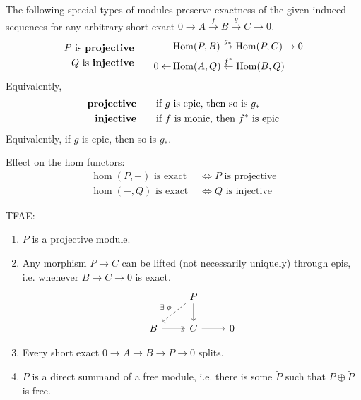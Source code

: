 \documentclass[twoside,10pt]{report}
\begin{document}
\begin{defn}[]
	The following special types of modules preserve exactness of the given induced sequences for any arbitrary short exact $0 \to A\stackrel{f}{\to } B\stackrel{g}{\to } C\to 0$.
	\begin{equation*}
		\begin{aligned}
			P \text{ is \textbf{projective}} \\
			Q \text{ is \textbf{injective}}
		\end{aligned}
		\qquad
		\begin{aligned}
			&\operatorname{Hom}(P,B) \stackrel{g_{*}}{\to } \operatorname{Hom}(P,C)\to 0 \\
			0 \leftarrow &\operatorname{Hom}(A,Q) \stackrel{f^{*}}{\leftarrow} \operatorname{Hom}(B,Q)
		\end{aligned}
	\end{equation*}
Equivalently,
\begin{equation*}
	\begin{aligned}
		\text{\textbf{projective}}\\
		\text{\textbf{injective}}\\
	\end{aligned}
	\qquad
	\begin{aligned}
		&\text{if $g$ is epic, then so is $g_{*}$}\\
		&\text{if $f$ is monic, then $f^{*}$ is epic}
	\end{aligned}
\end{equation*}
Equivalently, if $g$ is epic, then so is $g_{*}$.
\end{defn}

\begin{prop}
	Effect on the hom functors:
	\begin{equation*}
		\begin{aligned}
			\hom(P,-) \text{ is exact } &\iff P \text{ is projective} \\
			\hom(-,Q) \text{ is exact } &\iff Q \text{ is injective}
		\end{aligned}
	\end{equation*}
\end{prop}

\begin{thrm}
	TFAE:
	\begin{enumerate}
		\item $P$ is a projective module.
		\item Any morphism $P\to C$ can be lifted (not necessarily uniquely) through epis, i.e. whenever $B\to C\to 0$ is exact.
			\[
			\begin{tikzcd}
				& P \arrow[dl, dashed, "\exists\;\phi"'] \dar \\
				B \rar[two heads] & C \rar & 0
			\end{tikzcd}
			\]
		\item Every short exact $0\to A\to B\to P\to 0$ splits.
		\item $P$ is a direct summand of a free module, i.e. there is some $\tilde{P}$ such that $P \oplus \tilde{P}$ is free.
	\end{enumerate}
\end{thrm}
\end{document}
